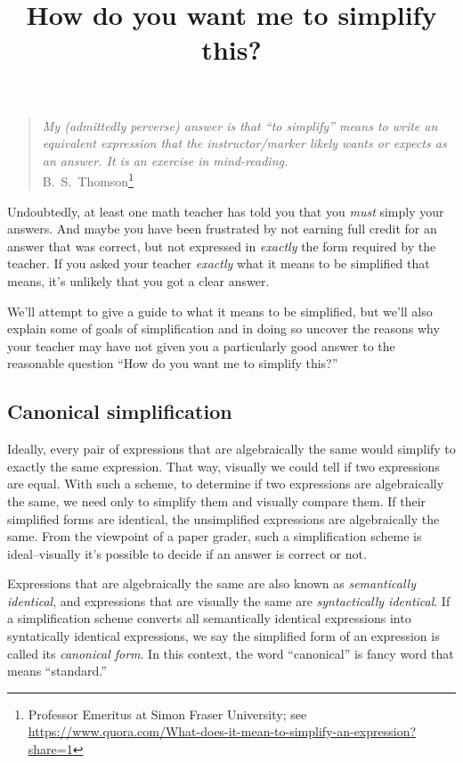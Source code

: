 \documentclass[12pt,fleqn]{article}
\title{How do you want me to simplify this?}
\begin{document}
\maketitle
\begin{quote}
\emph{My (admittedly perverse) answer is that ``to simplify''  means to write an equivalent expression that the instructor/marker likely wants or expects as an answer. It is an exercise in mind-reading.} \\  \phantom{xxxxx} \hfill   {\mbox{\sc B.\ S.\ Thomson}\footnote{\tiny Professor Emeritus at Simon Fraser University;  see  \url{https://www.quora.com/What-does-it-mean-to-simplify-an-expression?share=1}} }
\end{quote}


Undoubtedly, at least one math teacher has told you that you \emph{must} simply 
your answers. And maybe you have been frustrated by not earning full
credit for an answer that was correct, but not expressed in \emph{exactly}
the form required by the teacher. If you asked your teacher \emph{exactly} what it 
means to be simplified that means, it's unlikely that you got a clear 
answer. 

We'll attempt to give a guide to what it means to be simplified, but we'll
also explain some of goals of simplification and in doing so uncover
the reasons why your teacher may have not given you a particularly good
answer to the reasonable question ``How do you want me to simplify this?''

\subsection*{Canonical simplification}

Ideally, every pair of expressions that are algebraically the same would simplify to exactly the same expression. That way, visually we could
tell if two expressions are equal. With such a scheme, to determine if two expressions are algebraically the same, we need only to simplify them 
and visually compare them. If their simplified forms are identical, the unsimplified expressions are algebraically the same. From the viewpoint
of a paper grader, such a simplification scheme is ideal--visually it's possible to decide if an answer is correct or not.

Expressions that are algebraically the same are also known as \emph{semantically identical}, and expressions that are visually the same are \emph{syntactically identical}.  If a simplification scheme converts all semantically identical expressions into syntatically identical expressions,
we say the simplified form of an expression is called its \emph{canonical form}.  In this context, the word ``canonical'' is fancy word that means ``standard.''
\end{document}
